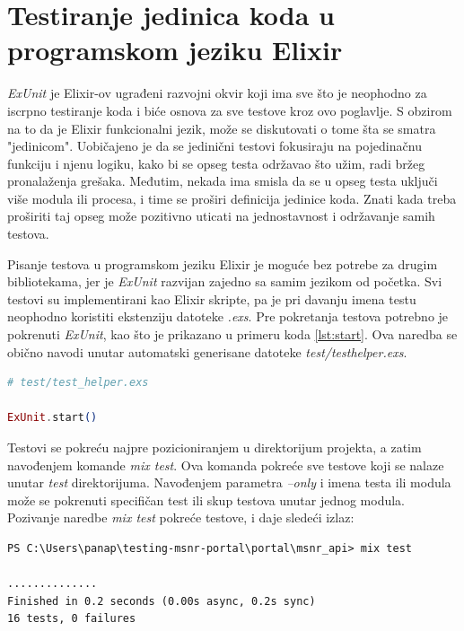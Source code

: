 \documentclass[12pt,oneside]{memoir}
\begin{document}
\section{Testiranje jedinica koda u programskom jeziku Elixir}
\label{sec:elixunit}

\textit{ExUnit} je Elixir-ov ugrađeni razvojni okvir koji ima sve što je neophodno za iscrpno testiranje koda i biće osnova za sve testove kroz ovo poglavlje. S obzirom na to da je Elixir funkcionalni jezik, može se diskutovati o tome šta se smatra "jedinicom". Uobičajeno je da se jedinični testovi fokusiraju na pojedinačnu funkciju i njenu logiku, kako bi se opseg testa održavao što užim, radi bržeg pronalaženja grešaka. Međutim, nekada ima smisla da se u opseg testa uključi više modula ili procesa, i time se proširi definicija jedinice koda. Znati kada treba proširiti taj opseg može pozitivno uticati na jednostavnost i održavanje samih testova. 
\par Pisanje testova u programskom jeziku Elixir je moguće bez potrebe za drugim bibliotekama, jer je \emph{ExUnit} razvijan zajedno sa samim jezikom od početka. Svi testovi su implementirani kao Elixir skripte, pa je pri davanju imena testu neophodno koristiti ekstenziju datoteke \emph{.exs}. Pre pokretanja testova potrebno je pokrenuti \emph{ExUnit}, kao što je prikazano u primeru koda \ref{lst:start}. Ova naredba se obično navodi unutar automatski generisane datoteke \emph{test/test{\textunderscore}helper.exs}. 

\begin{lstlisting}[language=elixir, caption={Pokretanje ExUnit},captionpos=b, label={lst:start}]
# test/test_helper.exs

ExUnit.start()
\end{lstlisting}

\par Testovi se pokreću najpre pozicioniranjem u direktorijum projekta, a zatim navođenjem komande \emph{mix test}. Ova komanda pokreće sve testove koji se nalaze unutar \emph{test} direktorijuma. Navođenjem parametra \emph{--only} i imena testa ili modula može se pokrenuti specifičan test ili skup testova unutar jednog modula. Pozivanje naredbe \emph{mix test} pokreće testove, i daje sledeći izlaz:  

\begin{lstlisting}[style=DOS]
PS C:\Users\panap\testing-msnr-portal\portal\msnr_api> mix test

..............
Finished in 0.2 seconds (0.00s async, 0.2s sync)
16 tests, 0 failures
\end{lstlisting}
\end{document}
